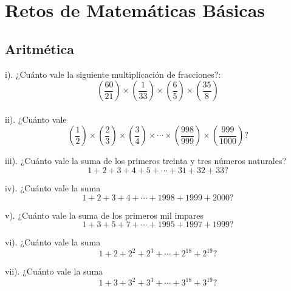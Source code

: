 \chapter*{Retos de Matemáticas Básicas}

\section*{Aritmética}

i). ¿Cuánto vale la siguiente multiplicación de fracciones?: $$\left(\frac{60}{21}\right)\times\left(\frac{1}{33}\right)\times\left(\frac{6}{5}\right)\times \left(\frac{35}{8}\right)$$\\


ii). ¿Cuánto vale $$\left(\frac{1}{2}\right)\times\left(\frac{2}{3}\right)\times\left(\frac{3}{4}\right)\times\cdots \times\left(\frac{998}{999}\right)\times\left( \frac{999}{1000}\right)?$$

iii). ¿Cuánto vale la suma de los primeros treinta y tres números naturales? $$1+2+3+4+5+\cdots+31+32 +33?$$

iv). ¿Cuánto vale la suma $$1+2+3+4+\cdots +1998+1999+2000?$$


v). ¿Cuánto vale la suma de los primeros mil impares $$1+3+5+7+\cdots +1995+1997+1999?$$


vi). ¿Cuánto vale la suma $$1+2+2^2+2^3+\cdots +2^{18}+2^{19}?$$


vii). ¿Cuánto vale la suma $$1+3+3^2+3^3+\cdots +3^{18}+3^{19}?$$



